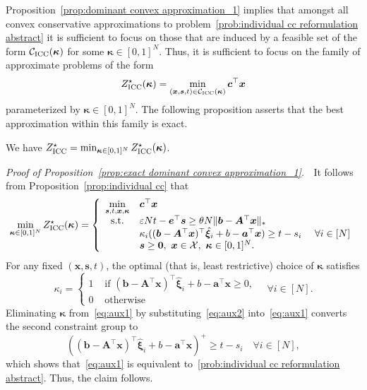 \documentclass[nonblindrev]{informs2017}
\newcommand{\bmh}[1]{\hat{\bm{#1}}}
\newcommand{\1}[1]{\mathds{1}{\left(#1\right)}}
\begin{document}
Proposition~\ref{prop:dominant convex approximation_1} implies that amongst all convex conservative approximations to problem~\eqref{prob:individual cc reformulation abstract} it is sufficient to focus on those that are induced by a feasible set of the form $\mathcal{C}_{\rm ICC}(\bm \kappa)$ for some $\bm{\kappa} \in[0,1]^N$. Thus, it is sufficient to focus on the family of approximate problems of the form
\begin{equation}
\label{prob:linear approximation individual cc_1}
Z^\star_{\rm ICC}(\bm{\kappa}) =\min_{(\bm{x},\bm{s}, t)\in \mathcal{C}_{\rm ICC}(\bm \kappa)} \bm c^\top \bm x
\end{equation}
parameterized by $\bm{\kappa} \in[0,1]^N$. The following proposition asserts that the best approximation within this family is exact.

\begin{proposition}\label{prop:exact dominant convex approximation_1}
	We have $Z^\star_{\rm ICC} = \min_{\bm\kappa \in [0,1]^N} Z^\star_{\rm ICC}(\bm{\kappa})$.
\end{proposition}


\noindent \emph{Proof of Proposition~\ref{prop:exact dominant convex approximation_1}.} $\;$
It follows from Proposition~\ref{prop:individual cc} that
\begin{equation}
\label{eq:aux1}
\min_{\bm \kappa\in [0,1]^N} Z^\star_{\rm ICC}(\bm{\kappa})=\left\{ \begin{array}{cll}
\displaystyle \min_{\bm{s}, t, \bm{x},\bm \kappa} & \bm{c}^\top\bm{x} \\
{\rm s.t.} & \varepsilon N t - \bm{e}^\top\bm{s} \geq \theta N  \|\bm{b} - \bm{A}^\top\bm{x}\|_*\\
& \kappa_i((\bm{b} - \bm{A}^\top\bm{x})^\top\bmh{\xi}_i + b - \bm{a}^\top\bm{x}) \geq t - s_i &~\forall i \in [N] \\
& \bm{s} \geq \bm{0}, ~\bm{x} \in \mathcal{X},~ \bm \kappa\in [0,1]^N.
\end{array}\right.
\end{equation}
For any fixed $(\bm{x}, \bm{s}, t)$, the optimal (that is, least restrictive) choice of $\bm \kappa$ satisfies
\begin{equation}
\label{eq:aux2}
\kappa_i = \left\{
\begin{array}{ll}
1 &\text{~if~} (\bm{b} - \bm{A}^\top\bm{x})^\top\bmh{\xi}_i + b- \bm{a}^\top\bm{x} \geq 0, \\
0 &\text{~otherwise} 
\end{array}
\right.
\quad \forall i\in [N].
\end{equation}
Eliminating $\bm \kappa$ from~\eqref{eq:aux1} by substituting~\eqref{eq:aux2} into~\eqref{eq:aux1} converts the second constraint group to
\[
((\bm{b} - \bm{A}^\top\bm{x})^\top\bmh{\xi}_i + b - \bm{a}^\top\bm{x})^+ \geq t - s_i \quad \forall i \in [N],
\]
which shows that~\eqref{eq:aux1} is equivalent to~\eqref{prob:individual cc reformulation abstract}. Thus, the claim follows.
\hfill \Halmos
\endproof
\end{document}
